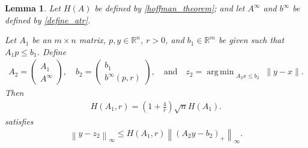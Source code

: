 \documentclass{article}
\newtheorem{lemma}[theorem]{Lemma}
\theoremstyle{case}
\numberwithin{theorem}{subsection}
\DeclareMathOperator*{\argmin}{arg\,min}
\newcommand{\atr}{A^{\infty}}
\newcommand{\btr}{b^{\infty}}
\newcommand{\Rm}{\mathbb R^m}
\newcommand{\Rn}{\mathbb R^n}
\begin{document}
\begin{lemma}
\label{version_of_hoffman_with_infinity_ball}
Let $H(A)$ be defined by \cref{hoffman_theorem}; and let $\atr$ and $\btr$ be defined by \cref{define_atr}.

Let $A_1$ be an $m \times n$ matrix, $p, y \in \Rn$, $r > 0$, and $b_1 \in \Rm$  be given 
such that $A_1p \le b_1$.
Define 
\begin{align*}
A_2 = \begin{pmatrix} A_1 \\ \atr \end{pmatrix},
\quad
b_2 = \begin{pmatrix} b_1 \\ \btr\left(p, r\right) \end{pmatrix},
\quad \textrm{and} \quad
z_2 = \argmin_{\substack{A_2 x \le b_2} } \|y - x\|.
\end{align*}
Then 
\begin{align}
H\left(A_1, r\right) = \left(1 + \frac 4 r\right)\sqrt{n} H\left(A_1\right).
\label{define_har}
\end{align}
satisfies
\begin{align*}
\left\|y - z_2\right\|_{\infty} 
\le 
H\left(A_1, r\right)
\left\|\left(A_2y - b_2\right)_+\right\|_{\infty}.
\end{align*}
\end{lemma}
\end{document}
